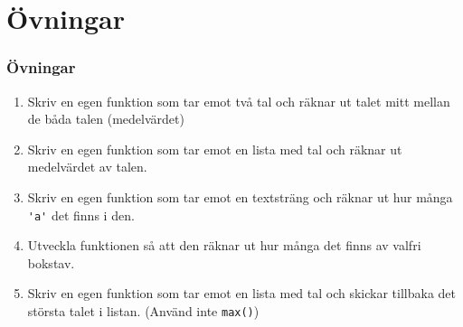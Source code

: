 \documentclass[aspectratio=169]{beamer}
\begin{document}
\section{Övningar}

\begin{frame}
	\frametitle{Övningar}
	
	\begin{enumerate}
 		\item Skriv en egen funktion som tar emot två tal och räknar ut talet mitt mellan de båda talen (medelvärdet)
 		\item Skriv en egen funktion som tar emot en lista med tal och räknar ut medelvärdet av talen.
  		\item Skriv en egen funktion som tar emot en textsträng och räknar ut hur många \lstinline{'a'} det finns i den.
  		\item Utveckla funktionen så att den räknar ut hur många det finns av valfri bokstav.
		\item Skriv en egen funktion som tar emot en lista med tal och skickar tillbaka det största talet i listan. (Använd inte \lstinline{max()})
	\end{enumerate}
	
\end{frame}

	
\end{document}
